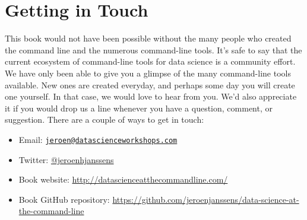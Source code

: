 \documentclass[
]{book}
\providecommand{\tightlist}{%
  \setlength{\itemsep}{0pt}\setlength{\parskip}{0pt}}
\theoremstyle{definition}
\theoremstyle{definition}
\theoremstyle{definition}
\theoremstyle{remark}
\begin{document}
\hypertarget{getting-in-touch}{%
\section{Getting in Touch}\label{getting-in-touch}}

This book would not have been possible without the many people who created the command line and the numerous command-line tools. It's safe to say that the current ecosystem of command-line tools for data science is a community effort. We have only been able to give you a glimpse of the many command-line tools available. New ones are created everyday, and perhaps some day you will create one yourself. In that case, we would love to hear from you. We'd also appreciate it if you would drop us a line whenever you have a question, comment, or suggestion. There are a couple of ways to get in touch:

\begin{itemize}
\tightlist
\item
  Email: \href{mailto:jeroen@datascienceworkshops.com}{\nolinkurl{jeroen@datascienceworkshops.com}}
\item
  Twitter: \href{https://twitter.com/jeroenhjanssens/}{@jeroenhjanssens}
\item
  Book website: \url{http://datascienceatthecommandline.com/}
\item
  Book GitHub repository: \url{https://github.com/jeroenjanssens/data-science-at-the-command-line}
\end{itemize}

  
\end{document}

